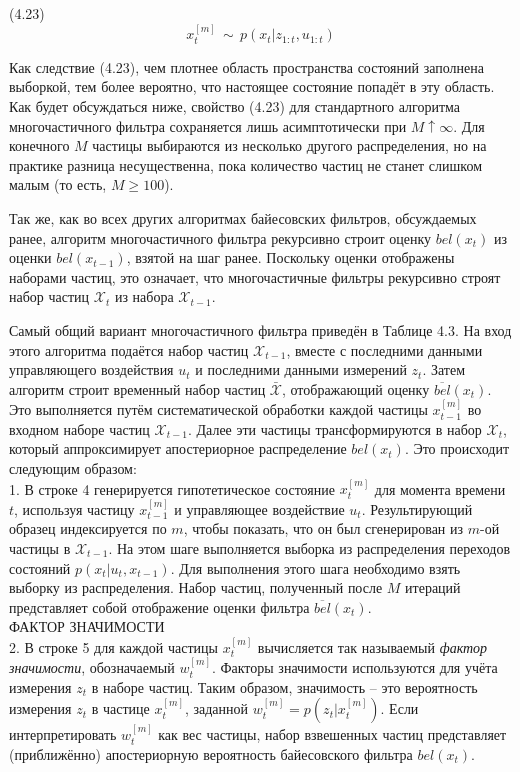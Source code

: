\documentclass[10pt,a4paper]{article}
\begin{document}
(4.23)
$$x_t^{[m]}\,\sim\,p(x_t|z_{1:t},u_{1:t})$$

Как следствие (4.23), чем плотнее область пространства состояний заполнена выборкой, тем более вероятно, что настоящее состояние попадёт в эту область. 
Как будет обсуждаться ниже, свойство (4.23) для стандартного алгоритма многочастичного фильтра сохраняется лишь асимптотически при
$M\uparrow\infty$. Для конечного $M$ частицы выбираются из несколько другого распределения, но на практике разница несущественна, пока количество частиц не станет слишком малым (то есть, $M\geq100$).

Так же, как во всех других алгоритмах байесовских фильтров, обсуждаемых ранее, алгоритм многочастичного фильтра рекурсивно строит оценку $bel(x_t)$ из оценки $bel(x_{t-1})$,
взятой на шаг ранее. Поскольку оценки отображены наборами частиц, это означает, что многочастичные фильтры рекурсивно строят набор частиц $\mathcal X_t$ из набора $\mathcal X_{t-1}$.

Самый общий вариант многочастичного фильтра приведён в Таблице 4.3.
На вход этого алгоритма подаётся набор частиц $\mathcal X_{t-1}$, вместе с последними данными управляющего воздействия $u_t$ и последними данными измерений $z_t$. Затем алгоритм строит временный набор частиц $\bar{\mathcal X}$, отображающий оценку $\overline{bel}(x_t)$. Это выполняется путём систематической обработки каждой частицы $x_{t-1}^{[m]}$ во входном наборе частиц $\mathcal X_{t-1}$. Далее эти частицы трансформируются в набор $\mathcal X_t$, который аппроксимирует апостериорное распределение $bel(x_t)$. Это происходит следующим образом:\\

1. В строке 4 генерируется гипотетическое состояние $x_t^{[m]}$ для момента времени $t$, используя частицу 
$x_{t-1}^{[m]}$ и управляющее воздействие $u_t$. Результирующий образец индексируется по $m$, чтобы показать, что он был сгенерирован из $m$-ой частицы в $\mathcal X_{t-1}$. На этом шаге выполняется выборка из распределения переходов состояний $p(x_t | u_t, x_{t-1})$. Для выполнения этого шага необходимо взять выборку из распределения. Набор частиц, полученный после $M$ итераций представляет собой отображение оценки фильтра $\overline{bel}(x_t)$.\\

ФАКТОР ЗНАЧИМОСТИ \\
2. В строке 5 для каждой частицы $x_t^{[m]}$ вычисляется так называемый \textit{фактор значимости}, обозначаемый $w_t^{[m]}$. Факторы значимости используются для учёта измерения 
$z_t$ в наборе частиц. Таким образом, значимость – это вероятность измерения $z_t$ в частице $x_t^{[m]}$, заданной $w_t^{[m]} = p(z_t | x_t^{[m]})$. Если интерпретировать $w_t^{[m]}$ как вес частицы, набор взвешенных частиц представляет (приближённо) апостериорную вероятность байесовского фильтра $bel(x_t)$.\\
\end{document}
